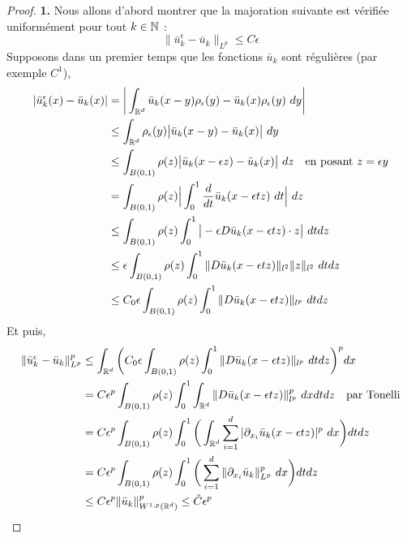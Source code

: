 \begin{proof}
    \vspace{1em}
    \textbf{1.}
    Nous allons d'abord montrer que la majoration suivante est vérifiée uniformément pour tout $k \in \mathbb{N}$ :
    $$\| \bar{u}_k^{\epsilon} - \bar{u}_k \|_{L^p} \leq C\epsilon $$
    Supposons dans un premier temps que les fonctions $\bar{u}_k$ sont régulières (par exemple $C^1$),
    \begin{equation*}
    \begin{split}
        |\bar{u}_k^{\epsilon}(x) - \bar{u}_k(x)| &= \bigg| \int_{\mathbb{R}^d} \bar{u}_k(x - y)\rho_{\epsilon}(y) - \bar{u}_k(x)\rho_{\epsilon}(y) \ dy \bigg| \\
        &\leq \int_{\mathbb{R}^d} \rho_{\epsilon}(y) \big| \bar{u}_k(x - y) - \bar{u}_k(x) \big| \ dy \\
        &\leq \int_{B(0,1)} \rho(z) \big| \bar{u}_k(x - \epsilon z) - \bar{u}_k(x) \big| \ dz \quad \text{en posant } z = \epsilon y \\ 
        &= \int_{B(0,1)} \rho(z) \Big| \int_{0}^{1} \frac{d}{dt} \bar{u}_k(x - \epsilon t z) \ dt \Big| \ dz \\
        &\leq \int_{B(0,1)} \rho(z) \int_{0}^{1} \big| -\epsilon D \bar{u}_k(x - \epsilon t z) \cdot z \big| \ dt dz \\
        &\leq \epsilon \int_{B(0,1)} \rho(z) \int_{0}^{1} \|D \bar{u}_k(x - \epsilon t z)\|_{l^2} \| z \|_{l^2} \ dt dz \\
        &\leq C_0 \epsilon \int_{B(0,1)} \rho(z) \int_{0}^{1} \|D \bar{u}_k(x - \epsilon t z)\|_{l^p} \ dt dz
    \end{split}
    \end{equation*}
    Et puis,
    \begin{equation*}
    \begin{split}
        \| \bar{u}_k^{\epsilon} - \bar{u}_k \|_{L^p}^p &\leq  \int_{\mathbb{R}^d} \bigg(C_0 \epsilon \int_{B(0,1)} \rho(z) \int_{0}^{1} \| D \bar{u}_k(x - \epsilon t z) \|_{l^p} \ dt dz \bigg)^p dx \\
        &= C \epsilon^p \int_{B(0,1)} \rho(z) \int_{0}^{1} \int_{\mathbb{R}^d} \| D \bar{u}_k(x - \epsilon t z) \|_{l^p}^p \ dx dt dz \quad \text{par Tonelli} \\
        &= C \epsilon^p \int_{B(0,1)} \rho(z) \int_{0}^{1} \bigg( \int_{\mathbb{R}^d} \sum_{i=1}^{d} |\partial_{x_i} \bar{u}_k(x - \epsilon t z)|^p \ dx \bigg) dt dz \\
        &= C \epsilon^p \int_{B(0,1)} \rho(z) \int_{0}^{1} \bigg( \sum_{i=1}^{d}  \| \partial_{x_i} \bar{u}_k \|_{L^p}^p \ dx \bigg) dt dz \\
        &\leq C \epsilon^p \| \bar{u}_k \|_{W^{1,p}(\mathbb{R}^d)}^p \leq \tilde{C} \epsilon^p
    \end{split}
    \end{equation*}


\end{proof}
